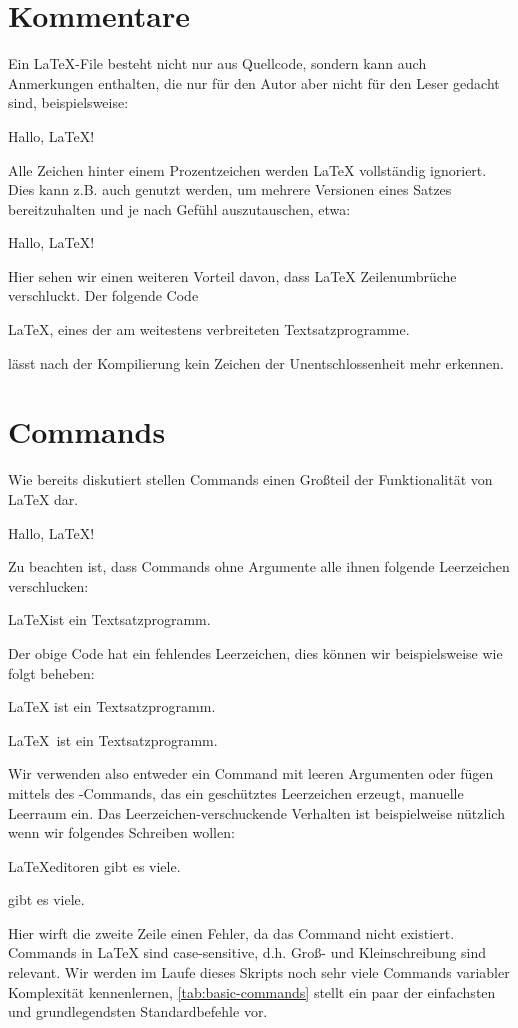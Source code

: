 \section{Kommentare}\label{sec:comments}
Ein \LaTeX{}-File besteht nicht nur aus Quellcode, sondern kann auch Anmerkungen enthalten, die nur für den Autor aber nicht für den Leser gedacht sind, beispielsweise:
\begin{latexlisting}
	Hallo, LaTeX!
\end{latexlisting}
Alle Zeichen hinter einem Prozentzeichen werden LaTeX vollständig ignoriert.
Dies kann z.B. auch genutzt werden, um mehrere Versionen eines Satzes bereitzuhalten und je nach Gefühl auszutauschen, etwa:
\begin{latexlisting}
	Hallo, LaTeX!
\end{latexlisting}
Hier sehen wir einen weiteren Vorteil davon, dass \LaTeX{} Zeilenumbrüche verschluckt.
Der folgende Code
\begin{latexlisting}
	LaTeX, eines der
	am weitestens verbreiteten %
	Textsatzprogramme.
\end{latexlisting}
lässt nach der Kompilierung kein Zeichen der Unentschlossenheit mehr erkennen.

\section{Commands}
Wie bereits diskutiert stellen Commands einen Großteil der Funktionalität von \LaTeX{} dar.
\begin{latexlisting}
	Hallo, \LaTeX!
\end{latexlisting}
Zu beachten ist, dass Commands ohne Argumente alle ihnen folgende Leerzeichen verschlucken:
\begin{latexlisting}
	\LaTeX ist ein Textsatzprogramm.
\end{latexlisting}
Der obige Code hat ein fehlendes Leerzeichen, dies können wir beispielsweise wie folgt beheben:
\begin{latexlisting}
	\LaTeX{} ist ein Textsatzprogramm.

	\LaTeX\ ist ein Textsatzprogramm.
\end{latexlisting}
Wir verwenden also entweder ein Command mit leeren Argumenten oder fügen mittels des \latexcommand{ }-Commands, das ein geschütztes Leerzeichen erzeugt, manuelle Leerraum ein.
Das Leerzeichen-verschuckende Verhalten ist beispielweise nützlich wenn wir folgendes Schreiben wollen:
\begin{latexlisting}
	\LaTeX editoren gibt es viele.

	\LaTeXeditoren gibt es viele.
\end{latexlisting}
Hier wirft die zweite Zeile einen Fehler, da das Command  nicht existiert.
Commands in \LaTeX{} sind case-sensitive, d.h. Groß- und Kleinschreibung sind relevant.
Wir werden im Laufe dieses Skripts noch sehr viele Commands variabler Komplexität kennenlernen, \autoref{tab:basic-commands} stellt ein paar der einfachsten und grundlegendsten Standardbefehle vor.


